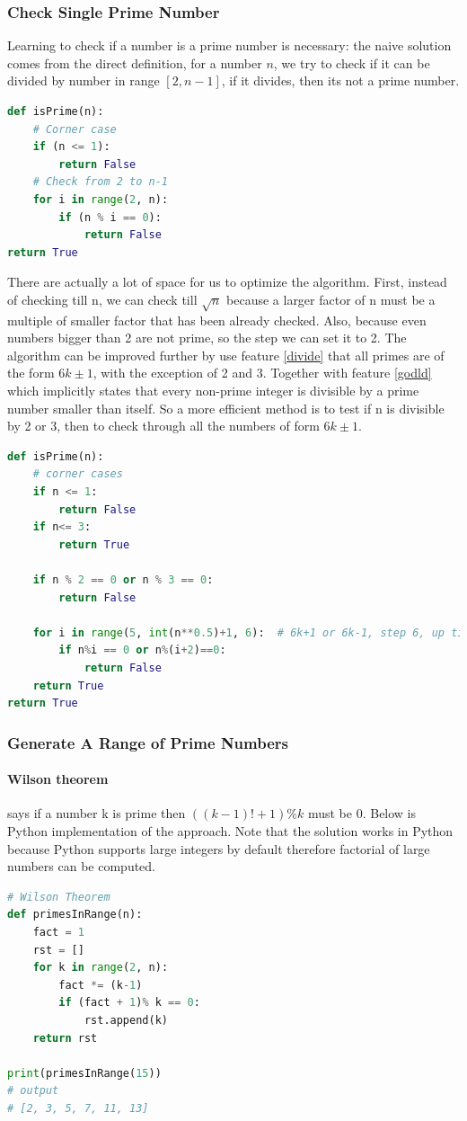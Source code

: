 \documentclass[../main.tex]{subfiles}
\begin{document}
\subsubsection{Check Single Prime Number}
Learning to check if a number is a prime number is necessary: the naive solution comes from the direct definition, for a number $n$, we try to check if it can be divided by number in range $[2, n-1]$, if it divides, then its not a prime number. 
\begin{lstlisting}[language=Python]
def isPrime(n):
    # Corner case
    if (n <= 1):
        return False
    # Check from 2 to n-1
    for i in range(2, n):
        if (n % i == 0):
            return False
return True
\end{lstlisting}
There are actually a lot of space for us to optimize the algorithm. First, instead of checking till n, we can check till $\sqrt{n}$ because a larger factor of n must be a multiple of smaller factor that has been already checked. Also, because even numbers bigger than 2 are not prime, so the step we can set it to 2. The algorithm can be improved further by use feature \ref{divide} that all primes are of the form $6k \pm 1$, with the exception of 2 and 3.  Together with feature \ref{godld} which implicitly states that every non-prime integer is divisible by a prime number smaller than itself. So a more efficient method is to test if n is divisible by 2 or 3, then to check through all the numbers of form $6k \pm 1$.
\begin{lstlisting}[language=Python]
def isPrime(n):
    # corner cases
    if n <= 1:
        return False
    if n<= 3:
        return True
    
    if n % 2 == 0 or n % 3 == 0:
        return False
        
    for i in range(5, int(n**0.5)+1, 6):  # 6k+1 or 6k-1, step 6, up till sqrt(n), when i=5, check 5 and 7, (k-1, k+1)
        if n%i == 0 or n%(i+2)==0:
            return False
    return True
return True
\end{lstlisting}

\subsubsection{Generate A Range of Prime Numbers}
\paragraph{Wilson theorem} says if a number k is prime then $((k-1)! + 1) \% k$ must be 0. Below is Python implementation of the approach. Note that the solution works in Python because Python supports large integers by default therefore factorial of large numbers can be computed.
\begin{lstlisting}[language=Python]
# Wilson Theorem
def primesInRange(n):
    fact = 1 
    rst = []
    for k in range(2, n):
        fact *= (k-1)
        if (fact + 1)% k == 0:
            rst.append(k)
    return rst
    
print(primesInRange(15)) 
# output
# [2, 3, 5, 7, 11, 13]
\end{lstlisting}
\end{document}
